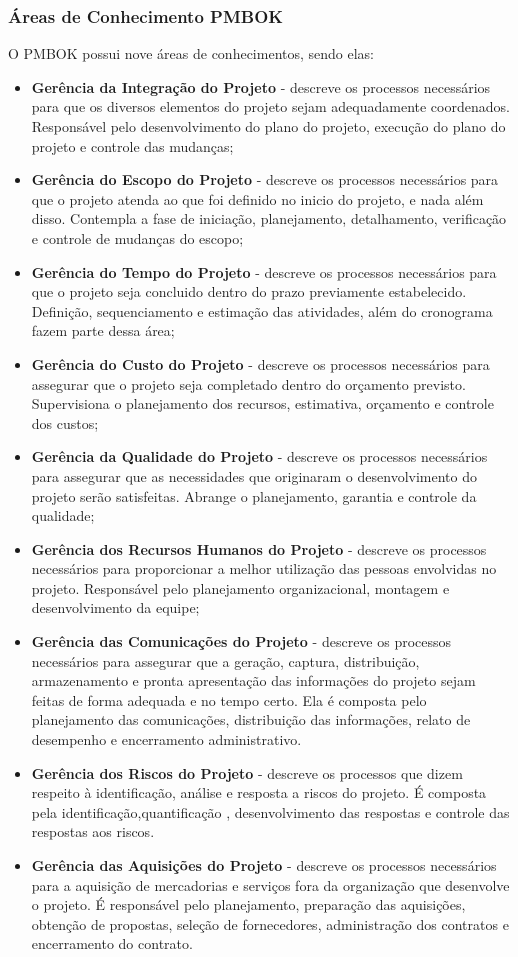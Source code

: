 \subsubsection{Áreas de Conhecimento PMBOK}

O PMBOK possui nove áreas de conhecimentos, sendo elas:

\begin{itemize}
	\item \textbf{Gerência da Integração do Projeto} - descreve os processos necessários para que os diversos elementos do projeto sejam adequadamente coordenados. Responsável pelo desenvolvimento do plano do projeto, execução do plano do projeto e controle das mudanças;
	\item \textbf{Gerência do Escopo do Projeto} - descreve os processos necessários para que o projeto atenda ao que foi definido no inicio do projeto, e nada além disso. Contempla a fase de iniciação, planejamento, detalhamento, verificação e controle de mudanças do escopo;
	\item \textbf{Gerência do Tempo do Projeto} - descreve os processos necessários para que o projeto seja concluido dentro do prazo previamente estabelecido. Definição, sequenciamento e estimação das atividades, além do cronograma fazem parte dessa área;
	\item \textbf{Gerência do Custo do Projeto} - descreve os processos necessários para assegurar que o projeto seja completado dentro do orçamento previsto. Supervisiona o planejamento dos recursos, estimativa, orçamento e controle dos custos;
	\item \textbf{Gerência da Qualidade do Projeto} - descreve os processos necessários para assegurar que as necessidades que originaram o desenvolvimento do projeto serão
	satisfeitas. Abrange o planejamento, garantia e controle da qualidade;
	\item \textbf{Gerência dos Recursos Humanos do Projeto} - descreve os processos necessários para proporcionar a melhor utilização das pessoas envolvidas no projeto. Responsável pelo planejamento organizacional, montagem e desenvolvimento da equipe;
	\item \textbf{Gerência das Comunicações do Projeto} - descreve os processos necessários para assegurar que a geração, captura, distribuição, armazenamento e pronta apresentação das informações do projeto sejam feitas de forma adequada e no tempo certo. Ela é composta pelo planejamento das comunicações, distribuição das
	informações, relato de desempenho e encerramento administrativo.
	\item \textbf{Gerência dos Riscos do Projeto} - descreve os processos que dizem respeito à identificação, análise e resposta a riscos do projeto. É composta pela identificação,quantificação , desenvolvimento das respostas e controle das respostas aos riscos.
	\item \textbf{Gerência das Aquisições do Projeto} - descreve os processos necessários para a aquisição de mercadorias e serviços fora da organização que desenvolve o 	projeto. É responsável pelo planejamento, preparação das aquisições, obtenção de propostas, seleção de fornecedores, administração dos contratos e encerramento do contrato.
\end{itemize}


